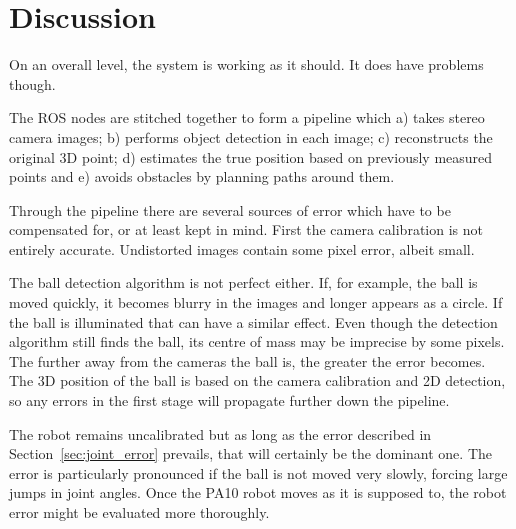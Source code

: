\chapter{Discussion}
\label{chap:discussion}
On an overall level, the system is working as it should. It does have problems though.

The ROS nodes are stitched together to form a pipeline which a) takes stereo camera images; b) performs object detection in each image; c) reconstructs the original 3D point; d) estimates the true position based on previously measured points and e) avoids obstacles by planning paths around them.

Through the pipeline there are several sources of error which have to be compensated for, or at least kept in mind.
First the camera calibration is not entirely accurate.
Undistorted images contain some pixel error, albeit small.

The ball detection algorithm is not perfect either.
If, for example, the ball is moved quickly, it becomes blurry in the images and longer appears as a circle.
If the ball is illuminated that can have a similar effect.
Even though the detection algorithm still finds the ball, its centre of mass may be imprecise by some pixels.
The further away from the cameras the ball is, the greater the error becomes.
The 3D position of the ball is based on the camera calibration and 2D detection, so any errors in the first stage will propagate further down the pipeline.

The robot remains uncalibrated but as long as the error described in Section~\ref{sec:joint_error} prevails, that will certainly be the dominant one. The error is particularly pronounced if the ball is not moved very slowly, forcing large jumps in joint angles. Once the PA10 robot moves as it is supposed to, the robot error might be evaluated more thoroughly.

